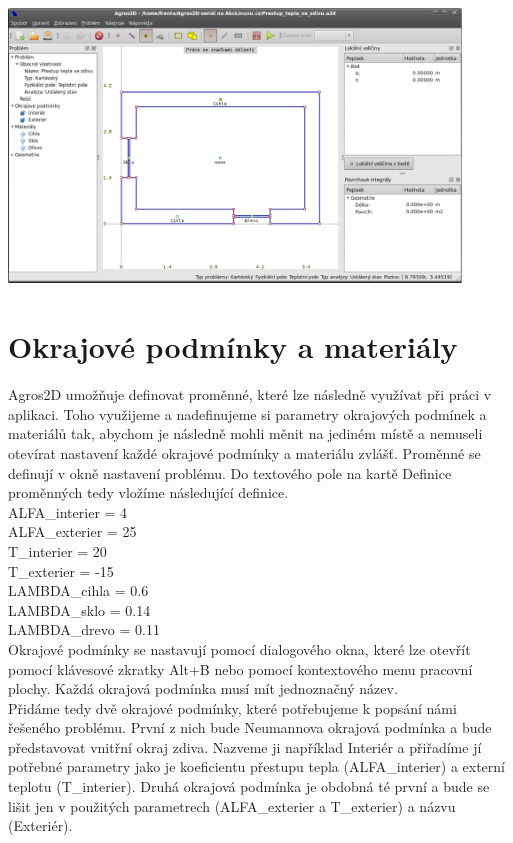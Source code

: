 \documentclass[a4paper, oneside]{article}
\begin{document}
\includegraphics[width=12cm]{geometrie_bez_izolace.eps}\\
\section{Okrajové podmínky a materiály}
Agros2D umožňuje definovat proměnné, které lze následně využívat při práci v aplikaci. Toho využijeme a nadefinujeme si parametry okrajových podmínek a materiálů tak, abychom je následně mohli měnit na jediném místě a nemuseli otevírat nastavení každé okrajové podmínky a materiálu zvlášť. Proměnné se definují v okně nastavení problému. Do textového pole na kartě Definice proměnných tedy vložíme následující definice.\\
ALFA\_interier = 4\\
ALFA\_exterier = 25\\
T\_interier = 20\\
T\_exterier = -15\\
LAMBDA\_cihla = 0.6\\
LAMBDA\_sklo = 0.14\\
LAMBDA\_drevo = 0.11\\
Okrajové podmínky se nastavují pomocí dialogového okna, které lze otevřít pomocí klávesové zkratky Alt+B nebo pomocí kontextového menu pracovní plochy. Každá okrajová podmínka musí mít jednoznačný název.\\
Přidáme tedy dvě okrajové podmínky, které potřebujeme k popsání námi řešeného problému. První z nich bude Neumannova okrajová podmínka a bude představovat vnitřní okraj zdiva. Nazveme ji například Interiér a přiřadíme jí potřebné parametry jako je koeficientu přestupu tepla (ALFA\_interier) a externí teplotu (T\_interier). Druhá okrajová podmínka je obdobná té první a bude se lišit jen v použitých parametrech (ALFA\_exterier a T\_exterier) a názvu (Exteriér).\\
\end{document}
